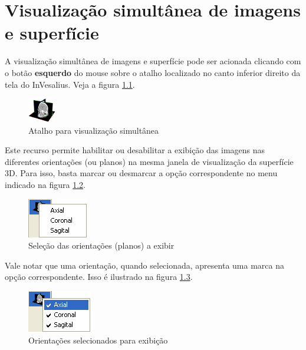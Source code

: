 \chapter{Visualização simultânea de imagens e superfície}

A visualização simultânea de imagens e superfície pode ser acionada clicando com o botão
\textbf{esquerdo} do mouse sobre o atalho localizado no canto inferior direito da tela do
InVesalius. Veja a figura \ref{fig:slice_plane_original}.

\begin{figure}[!htb]
\centering
\includegraphics[scale=0.6]{../user_guide_figures/icons/slice_plane_original.png}
\caption{Atalho para visualização simultânea}
\label{fig:slice_plane_original}
\end{figure}

Este recurso permite habilitar ou desabilitar a exibição das imagens nas diferentes
orientações (ou planos) na mesma janela de visualização da superfície 3D. Para isso, basta
marcar ou desmarcar a opção correspondente no menu indicado na figura \ref{fig:view_2d_3d_1}.

\begin{figure}[!htb]
\centering
\includegraphics[scale=0.6]{../user_guide_figures/invesalius_screen/view_2d_3d_1.png}
\caption{Seleção das orientações (planos) a exibir}
\label{fig:view_2d_3d_1}
\end{figure}

Vale notar que uma orientação, quando selecionada, apresenta uma marca na opção correspondente.
Isso é ilustrado na figura \ref{fig:view_2d_3d_2}.

\begin{figure}[!htb]
\centering
\includegraphics[scale=0.6]{../user_guide_figures/invesalius_screen/view_2d_3d_2.png}
\caption{Orientações selecionados para exibição}
\label{fig:view_2d_3d_2}
\end{figure}


